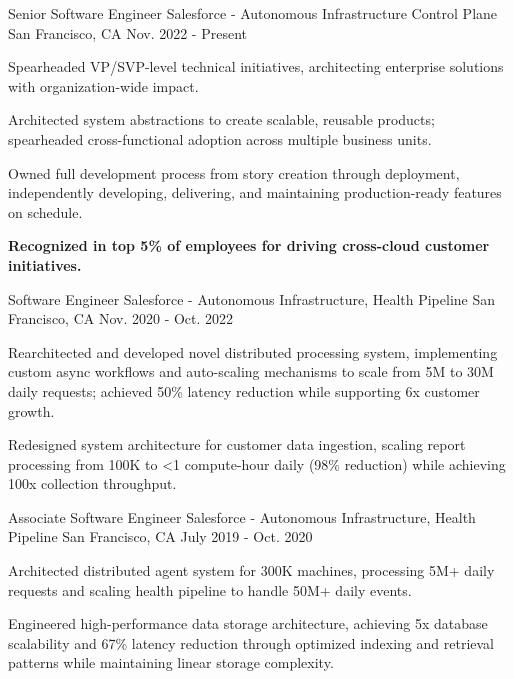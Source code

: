 \begin{cventries}
  \cventry
    {Senior Software Engineer} %
    {Salesforce - Autonomous Infrastructure Control Plane} %
    {San Francisco, CA} %
    {Nov. 2022 - Present} %
    {
      \begin{cvitems} %
        \item {Spearheaded VP/SVP-level technical initiatives, architecting enterprise solutions with organization-wide impact.}
        \item {Architected system abstractions to create scalable, reusable products; spearheaded cross-functional adoption across multiple business units.}
        \item {Owned full development process from story creation through deployment, independently developing, delivering, and maintaining production-ready features on schedule.}
        \item {\textbf{Recognized in top 5\% of employees for driving cross-cloud customer initiatives.}}
      \end{cvitems}
    }

  \cventry
    {Software Engineer} %
    {Salesforce - Autonomous Infrastructure, Health Pipeline} %
    {San Francisco, CA} %
    {Nov. 2020 - Oct. 2022} %
    {
      \begin{cvitems} %
        \item {Rearchitected and developed novel distributed processing system, implementing custom async workflows and auto-scaling mechanisms to scale from 5M to 30M daily requests; achieved 50\% latency reduction while supporting 6x customer growth.}
        \item {Redesigned system architecture for customer data ingestion, scaling report processing from 100K to <1 compute-hour daily (98\% reduction) while achieving 100x collection throughput.}
      \end{cvitems}
    }

  \cventry
    {Associate Software Engineer} %
    {Salesforce - Autonomous Infrastructure, Health Pipeline} %
    {San Francisco, CA} %
    {July 2019 - Oct. 2020} %
    {
      \begin{cvitems} %
        \item {Architected distributed agent system for 300K machines, processing 5M+ daily requests and scaling health pipeline to handle 50M+ daily events.}
        \item {Engineered high-performance data storage architecture, achieving 5x database scalability and 67\% latency reduction through optimized indexing and retrieval patterns while maintaining linear storage complexity.}
      \end{cvitems}
    }


\end{cventries}
